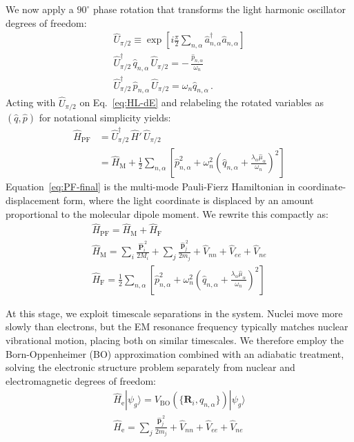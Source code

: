 \documentclass[%
 reprint,
 amsmath,amssymb,
 aps,
]{revtex4-2}
\begin{document}
We now apply a $90^\circ$ phase rotation that transforms the light harmonic oscillator degrees of freedom:
\begin{gather}
\hat{U}_{\pi/2} \equiv \exp\!\left[i\frac{\pi}{2}\sum_{n,\alpha}\hat{a}_{n,\alpha}^\dagger \hat{a}_{n,\alpha}\right] \\
\hat{U}_{\pi/2}^{\dagger}\,\hat{q}_{n,\alpha}\,\hat{U}_{\pi/2} = -\,\frac{\hat{p}_{n,\alpha}}{\omega_n} \\
\hat{U}_{\pi/2}^{\dagger}\,\hat{p}_{n,\alpha}\,\hat{U}_{\pi/2} = \omega_n \hat{q}_{n,\alpha} \,.
\end{gather}
Acting with $\hat{U}_{\pi/2}$ on Eq.~\eqref{eq:HL-dE} and relabeling the rotated variables as $(\hat{q},\hat{p})$ for notational simplicity yields:
\begin{align}
\hat{H}_{\mathrm{PF}}
&= \hat{U}_{\pi/2}^{\dagger}\, \hat{H}'\, \hat{U}_{\pi/2} \nonumber\\
&= \hat{H}_\mathrm{M}
+ \frac{1}{2} \sum_{n,\alpha}\left[
\hat{p}_{n,\alpha}^2 + \omega_n^2\!\left(\hat{q}_{n,\alpha} + \frac{\lambda_{\alpha} \hat{\mu}_\alpha}{\omega_n}\right)^{\!2}
\right]
\label{eq:PF-final}
\end{align}
Equation~\eqref{eq:PF-final} is the multi-mode Pauli-Fierz Hamiltonian in coordinate-displacement form, where the light coordinate is displaced by an amount proportional to the molecular dipole moment.
We rewrite this compactly as:
\begin{gather}
\hat{H}_\mathrm{PF} = \hat{H}_\mathrm{M}+\hat{H}_\mathrm{F} \label{eq:H-final}
\\
\hat{H}_\mathrm{M} = \sum_i \frac{\hat{\bm P}_i^{\,2}}{2M_i} + \sum_j \frac{\hat{\bm p}_j^{\,2}}{2m_j} + \hat{V}_{nn}+\hat{V}_{ee}+\hat{V}_{ne} \label{eq:HM-final}
\\
\hat{H}_\mathrm{F} = \frac{1}{2} \sum_{n,\alpha}\left[
\hat{p}_{n,\alpha}^2 + \omega_n^2\!\left(\hat{q}_{n,\alpha} + \frac{\lambda_{\alpha} \hat{\mu}_\alpha }{\omega_n}\right)^{\!2}
\right] \label{eq:HF-final}
\end{gather}

At this stage, we exploit timescale separations in the system.
Nuclei move more slowly than electrons, but the EM resonance frequency typically matches nuclear vibrational motion, placing both on similar timescales.
We therefore employ the Born-Oppenheimer (BO) approximation combined with an adiabatic treatment, solving the electronic structure problem separately from nuclear and electromagnetic degrees of freedom:
\begin{gather}
\hat{H}_\mathrm{e} | \psi_g \rangle = V_\mathrm{BO}(\{ \bm{R}_i,q_{n,\alpha} \}) | \psi_g \rangle \\
\hat{H}_\mathrm{e} = \sum_j \frac{\hat{\bm p}_j^{\,2}}{2m_j}+\hat{V}_{nn}+\hat{V}_{ee}+\hat{V}_{ne}
\end{gather}
\end{document}
